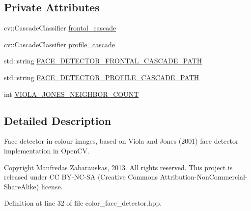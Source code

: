 \subsection*{\-Private \-Attributes}
\begin{DoxyCompactItemize}
\item 
cv\-::\-Cascade\-Classifier \hyperlink{class_r_p_color_face_detector_a4ab7e99e6da2768d2005d573a43d1f30}{frontal\-\_\-cascade}
\item 
cv\-::\-Cascade\-Classifier \hyperlink{class_r_p_color_face_detector_a27f973deeb52ebaa3c9a49a8eace16a5}{profile\-\_\-cascade}
\item 
std\-::string \hyperlink{class_r_p_color_face_detector_a22af60d876ae98cf57f73cdf6ff24d82}{\-F\-A\-C\-E\-\_\-\-D\-E\-T\-E\-C\-T\-O\-R\-\_\-\-F\-R\-O\-N\-T\-A\-L\-\_\-\-C\-A\-S\-C\-A\-D\-E\-\_\-\-P\-A\-T\-H}
\item 
std\-::string \hyperlink{class_r_p_color_face_detector_a21186fee954aa109b73910875f60f7f0}{\-F\-A\-C\-E\-\_\-\-D\-E\-T\-E\-C\-T\-O\-R\-\_\-\-P\-R\-O\-F\-I\-L\-E\-\_\-\-C\-A\-S\-C\-A\-D\-E\-\_\-\-P\-A\-T\-H}
\item 
int \hyperlink{class_r_p_color_face_detector_ae86967285f09aa17afa81dce94642aff}{\-V\-I\-O\-L\-A\-\_\-\-J\-O\-N\-E\-S\-\_\-\-N\-E\-I\-G\-H\-B\-O\-R\-\_\-\-C\-O\-U\-N\-T}
\end{DoxyCompactItemize}


\subsection{\-Detailed \-Description}
\-Face detector in colour images, based on \-Viola and \-Jones (2001) face detector implementation in \-Open\-C\-V. 

\begin{DoxyCopyright}{\-Copyright}
\-Manfredas \-Zabarauskas, 2013. \-All rights reserved. \-This project is released under \-C\-C \-B\-Y-\/\-N\-C-\/\-S\-A (\-Creative \-Commons \-Attribution-\/\-Non\-Commercial-\/\-Share\-Alike) license. 
\end{DoxyCopyright}


\-Definition at line 32 of file color\-\_\-face\-\_\-detector.\-hpp.



